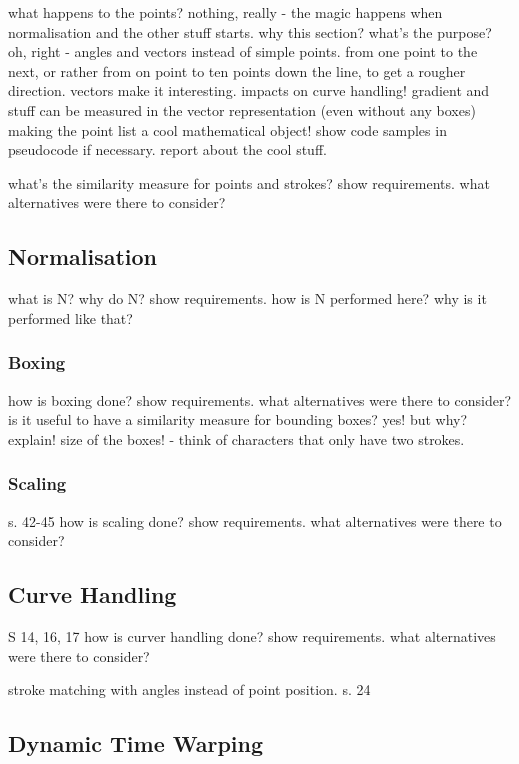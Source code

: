 what happens to the points?
nothing, really - the magic happens when normalisation and the other stuff
starts.
why this section? what's the purpose? oh, right - angles and vectors instead
of simple points. from one point to the next, or rather from on point to
ten points down the line, to get a rougher direction.
vectors make it interesting. 
impacts on curve handling! gradient and stuff can be measured in the 
vector representation (even without any boxes)
making the point list a cool mathematical object!
show code samples in pseudocode if necessary.
report about the cool stuff.

what's the similarity measure for
points and strokes?
show requirements.
what alternatives were there to consider?

\subsection{Normalisation}
\label{sec:hwre:normalisation}

what is N?
why do N?
show requirements.
how is N performed here?
why is it performed like that?

\subsubsection{Boxing}
\label{sec:hwre:boxing}
how is boxing done?
show requirements.
what alternatives were there to consider?
is it useful to have a similarity measure for bounding boxes?
yes! but why? explain!
size of the boxes! - think of characters that only have two strokes.

\subsubsection{Scaling}
\label{sec:hwre:scaling}

s. 42-45
how is scaling done?
show requirements.
what alternatives were there to consider?

\subsection{Curve Handling}
\label{sec:hwre:curvehandling}

S 14, 16, 17
how is curver handling done?
show requirements.
what alternatives were there to consider?

stroke matching with angles instead of point position.
s. 24

\subsection{Dynamic Time Warping}
\label{sec:hwre:dynamictimewarping}

